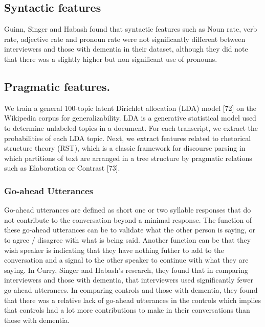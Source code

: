 \documentclass[10pt, letterpaper, twoside, openany]{thesis}
\begin{document}
\subsection{Syntactic features}
Guinn, Singer and Habash \cite{Guinn2015} found that syntactic features such as Noun rate, verb rate, adjective rate and pronoun rate were not significantly different between interviewers and those with dementia in their dataset, although they did note that there was a slightly higher but non significant use of pronouns. 

\subsection{Pragmatic features.} We train a general 100-topic latent Dirichlet allocation (LDA) model [72] on the Wikipedia corpus for generalizability. LDA is a generative statistical model used to determine unlabeled topics in a document. For each transcript, we extract the probabilities of each LDA topic. Next, we extract features related to rhetorical structure theory (RST), which is a classic framework for discourse parsing in which partitions of text are arranged in a tree structure by pragmatic relations such as Elaboration or Contrast [73].

\subsubsection{Go-ahead Utterances}
Go-ahead utterances are defined as short one or two syllable responses that do not contribute to the conversation beyond a minimal response. The function of these go-ahead utterances can be to validate what the other person is saying, or to agree / disagree with what is being said. Another function can be that they wish speaker is indicating that they have nothing futher to add to the conversation and a signal to the other speaker to continue with what they are saying. In Curry, Singer and Habash's research, they found that in comparing interviewers and those with dementia, that interviewers used significantly fewer go-ahead utterances. In comparing controls and those with dementia, they found that there was a relative lack of go-ahead utterances in the controls which implies that controls had a lot more contributions to make in their conversations than those with dementia. 
\par 

 
\end{document}
